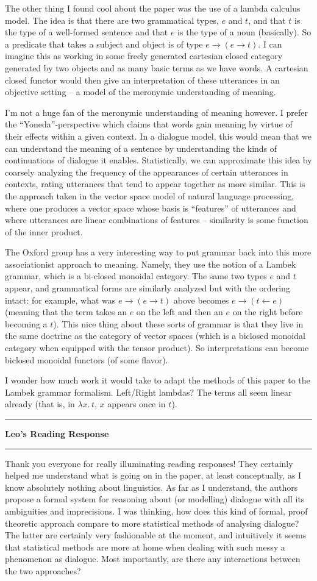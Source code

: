 \documentclass{amsart}
\newcommand{\iam}[1]{
  \vspace{0.25em}
  \hrule
  \vspace{0.25em}
  \textbf{{#1}'s Reading Response}
  \vspace{0.25em}
  \hrule
  \vspace{1em}
}
\begin{document}
The other thing I found cool about the paper was the use of a lambda calculus model. The idea is that there are two grammatical types, $e$ and $t$, and that $t$ is the type of a well-formed sentence and that $e$ is the type of a noun (basically). So a predicate that takes a subject and object is of type $e \to (e \to t)$. I can imagine this as working in some freely generated cartesian closed category generated by two objects and as many basic terms as we have words. A cartesian closed functor would then give an interpretation of these utterances in an objective setting -- a model of the meronymic understanding of meaning.

I'm not a huge fan of the meronymic understanding of meaning however. I prefer the ``Yoneda''-perspective which claims that words gain meaning by virtue of their effects within a given context. In a dialogue model, this would mean that we can understand the meaning of a sentence by understanding the kinds of continuations of dialogue it enables. Statistically, we can approximate this idea by coarsely analyzing the frequency of the appearances of certain utterances in contexts, rating utterances that tend to appear together as more similar. This is the approach taken in the vector space model of natural language processing, where one produces a vector space whose basis is ``features'' of utterances and where utterances are linear combinations of features -- similarity is some function of the inner product.

The Oxford group has a very interesting way to put grammar back into this more associationist approach to meaning. Namely, they use the notion of a Lambek grammar, which is a bi-closed monoidal category. The same two types $e$ and $t$ appear, and grammatical forms are similarly analyzed but with the ordering intact: for example, what was $e \to (e \to t)$ above becomes $e \to (t \leftarrow e)$ (meaning that the term takes an $e$ on the left and then an $e$ on the right before becoming a $t$). This nice thing about these sorts of grammar is that they live in the same doctrine as the category of vector spaces (which is a biclosed monoidal category when equipped with the tensor product). So interpretations can become biclosed monoidal functors (of some flavor).

I wonder how much work it would take to adapt the methods of this paper to the Lambek grammar formalism. Left/Right lambdas? The terms all seem linear already (that is, in $\lambda x.\, t$, $x$ appears once in $t$).

\iam{Leo}
Thank you everyone for really illuminating reading responses! They certainly helped me understand what is going on in the paper, at least conceptually, as I know absolutely nothing about linguistics. As far as I understand, the authors propose a formal system for reasoning about (or modelling) dialogue with all its ambiguities and imprecisions. I was thinking, how does this kind of formal, proof theoretic approach compare to more statistical methods of analysing dialogue? The latter are certainly very fashionable at the moment, and intuitively it seems that statistical methods are more at home when dealing with such messy a phenomenon as dialogue. Most importantly, are there any interactions between the two approaches?
\end{document}

